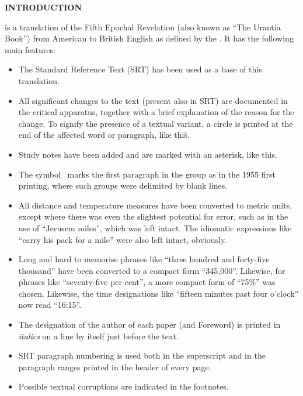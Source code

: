 \thispagestyle{empty}

\makeatletter
{}%
\makeatother

\begin{center}
\LARGE\bfseries
INTRODUCTION
\end{center}


 is a translation of the Fifth Epochal Revelation (also known as ``The Urantia Book'')
from American to British English as defined by the .
It has the following main features:

\begin{itemize}
\item The Standard Reference Text (SRT) has been used as a base of this translation.
\item All significant changes to the text (present also in SRT) are documented in the critical apparatus, together with a brief explanation of the reason for the change. To signify the presence of a textual variant, a circle is printed at the end of the affected word or paragraph, like this\r{}.
\item Study notes have been added and are marked with an asterisk, like this\ts{*}.
\item The symbol \pc\ marks the first paragraph in the group as in the 1955 first printing, where such groups were delimited by blank lines.
\item All distance and temperature measures have been converted to metric units, except where there was even the slightest potential for error, such as in the use of ``Jerusem miles'', which was left intact. The idiomatic expressions like ``carry his pack for a mile'' were also left intact, obviously.
\item Long and hard to memorise phrases like ``three hundred and forty\hyp{}five thousand'' have been converted to a compact form ``345,000''. Likewise, for phrases like ``seventy\hyp{}five per cent'', a more compact form of ``75\%'' was chosen. Likewise, the time designations like ``fifteen minutes past four o’clock'' now read ``16:15''.
\item The designation of the author of each paper (and Foreword) is printed in \textit{italics} on a line by itself just before the text.
\item SRT paragraph numbering is used both in the superscript and in the paragraph ranges printed in the head\-er of every page.
\item Possible textual corruptions are indicated in the footnotes.
\end{itemize}

